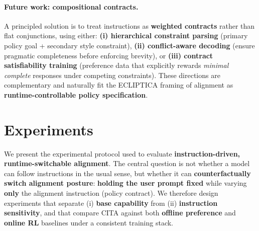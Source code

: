 \paragraph{\textbf{Future work: compositional contracts.}}
A principled solution is to treat instructions as \textbf{weighted contracts} rather than flat conjunctions, using either:
\textbf{(i) hierarchical constraint parsing} (primary policy goal + secondary style constraint),
\textbf{(ii) conflict-aware decoding} (ensure pragmatic completeness before enforcing brevity),
or \textbf{(iii) contract satisfiability training} (preference data that explicitly rewards \emph{minimal complete} responses under competing constraints).
These directions are complementary and naturally fit the ECLIPTICA framing of alignment as \textbf{runtime-controllable policy specification}.
























\vspace{-2mm}
\section{Experiments}
\label{sec:experiments}

We present the experimental protocol used to evaluate \textbf{instruction-driven, runtime-switchable alignment}.
The central question is not whether a model can follow instructions in the usual sense, but whether it can \textbf{counterfactually switch alignment posture}:
\textbf{holding the user prompt fixed} while varying \textbf{only} the alignment instruction (policy contract).
We therefore design experiments that separate (i) \textbf{base capability} from (ii) \textbf{instruction sensitivity}, and that compare \textsc{CITA} against both \textbf{offline preference} and \textbf{online RL} baselines under a consistent training stack.

